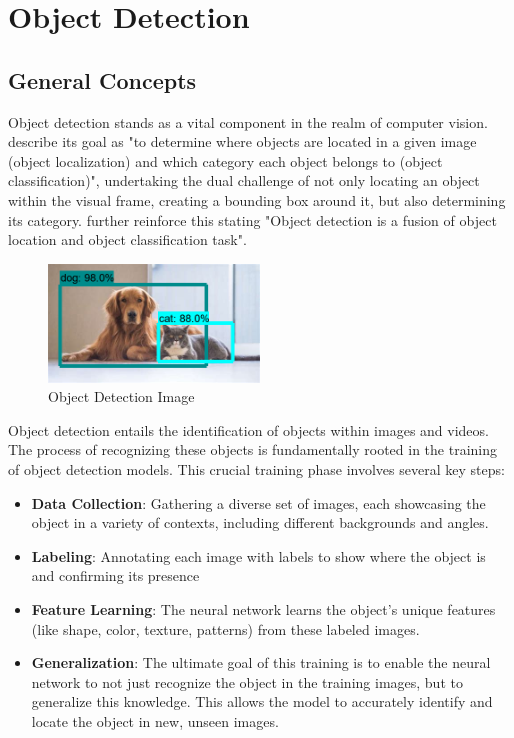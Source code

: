 \section{Object Detection}
\subsection{General Concepts}
Object detection stands as a vital component in the realm of computer vision. \citet{rfc2} describe its goal as "to determine where objects are located in a given image (object localization) and which category each object belongs to (object classification)", undertaking the dual challenge of not only locating an object within the visual frame, creating a bounding box around it, but also determining its category. \citet{rfc9} further reinforce this stating "Object detection is a fusion of object location and object classification task".

\begin{figure}[h]
    \centering 
    \includegraphics[width=0.5\textwidth]{figs/object-detection.png} 
    \caption{Object Detection Image~\cite{rfc15}}
    \label{fig:object-detection}
\end{figure}

Object detection entails the identification of objects within images and videos. The process of recognizing these objects is fundamentally rooted in the training of object detection models. This crucial training phase involves several key steps:
\begin{itemize}
    \item \textbf{Data Collection}: Gathering a diverse set of images, each showcasing the object in a variety of contexts, including different backgrounds and angles.
    \item \textbf{Labeling}: Annotating each image with labels to show where the object is and confirming its presence
    \item \textbf{Feature Learning}: The neural network learns the object's unique features (like shape, color, texture, patterns) from these labeled images.
    \item \textbf{Generalization}: The ultimate goal of this training is to enable the neural network to not just recognize the object in the training images, but to generalize this knowledge. This allows the model to accurately identify and locate the object in new, unseen images.
\end{itemize} 

